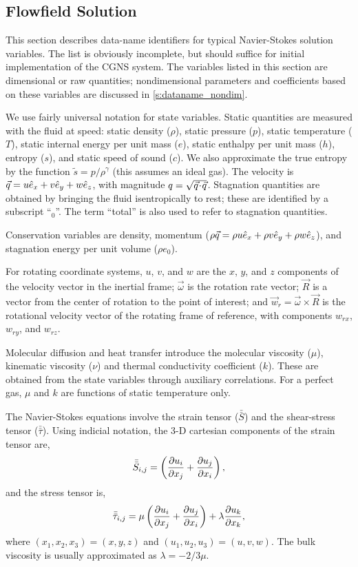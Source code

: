 \subsection{Flowfield Solution}
\label{s:dataname_flow}

This section describes data-name identifiers for typical Navier-Stokes
solution variables.  The list is obviously incomplete, but should
suffice for initial implementation of the CGNS system.  The variables
listed in this section are dimensional or raw quantities; nondimensional
parameters and coefficients based on these variables are discussed in
\autoref{s:dataname_nondim}.

We use fairly universal notation for state variables.  Static quantities
are measured with the fluid at speed: static density ($\rho$), static
pressure ($p$), static temperature ($T$), static internal energy per
unit mass ($e$), static enthalpy per unit mass ($h$), entropy ($s$),
and static speed of sound ($c$).  We also approximate the true entropy
by the function $\tilde{s} = p/\rho^\gamma$ (this assumes an ideal
gas).  The velocity is ${\vec{q}} = u \hat{e}_x + v \hat{e}_y + w \hat{e}_z$, with magnitude
$q = \sqrt{ {\vec{q}}\!\cdot\!{\vec{q}} }$. Stagnation quantities are obtained
by bringing the fluid isentropically to rest; these are identified
by a subscript ``${}_0$''.  The term ``total'' is also used to refer to
stagnation quantities.

Conservation variables are density, momentum
($\rho {\vec{q}} = \rho u \hat{e}_x + \rho v \hat{e}_y + \rho w \hat{e}_z$), and stagnation
energy per unit volume ($\rho e_0$).

For rotating coordinate systems, $u$, $v$, and $w$ are the $x$, $y$,
and $z$ components of the velocity vector in the inertial frame;
$\vec{\omega}$ is the rotation rate vector; $\vec{R}$ is a vector from
the center of rotation to the point of interest; and $\vec{w}_r =
\vec{\omega} \times \vec{R}$ is the rotational velocity vector of the
rotating frame of reference, with components $w_{rx}$, $w_{ry}$, and
$w_{rz}$.

Molecular diffusion and heat transfer introduce the molecular viscosity
($\mu$), kinematic viscosity ($\nu$) and thermal conductivity coefficient
($k$).  These are obtained from the state variables through auxiliary
correlations.  For a perfect gas, $\mu$ and $k$ are functions of static
temperature only.

The Navier-Stokes equations involve the strain tensor ($\bar{\bar{S}}$) and
the shear-stress tensor ($\bar{\bar{\tau}}$).  Using indicial notation, the
3-D cartesian components of the strain tensor are,
$$
 \bar{\bar{S}}_{i,j} = \left( {\partial u_i \over \partial x_j} + {\partial u_j \over \partial x_i} \right),
$$
and the stress tensor is, 
$$
 \bar{\bar{\tau}}_{i,j} = \mu \left( {\partial u_i \over \partial x_j} + {\partial u_j \over \partial x_i} \right)
 + \lambda {\partial u_k \over \partial x_k},
$$
where $(x_1,x_2,x_3) = (x,y,z)$ and $(u_1,u_2,u_3) = (u,v,w)$.  The bulk
viscosity is usually approximated as $\lambda = -2/3 \mu$.  


